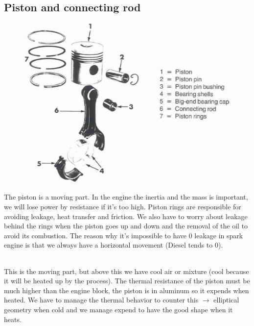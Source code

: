 		\subsection{Piston and connecting rod}
			\begin{figure}
			\vspace{-12mm}
			\includegraphics[scale=0.25]{ch1/13}
			\end{figure}
			The piston is a moving part. In the engine the inertia and the mass is important, we will lose power by resistance if it's too high. Piston rings are responsible for avoiding leakage, heat transfer and friction. We also have to worry about leakage behind the rings when the piston goes up and down and the removal of the oil to avoid its combustion. The reason why it's impossible to have 0 leakage in spark engine is that we always have a horizontal movement (Diesel tends to 0).
			
			 \ \\ This is the moving part, but above this we have cool air or mixture (cool because it will be heated up by the process). The thermal resistance of the piston must be much higher than the engine block, the piston is in aluminum so it expends when heated. We have to manage the thermal behavior to counter this $\rightarrow$ elliptical geometry when cold and we manage expend to have the good shape when it heats. \\
			
